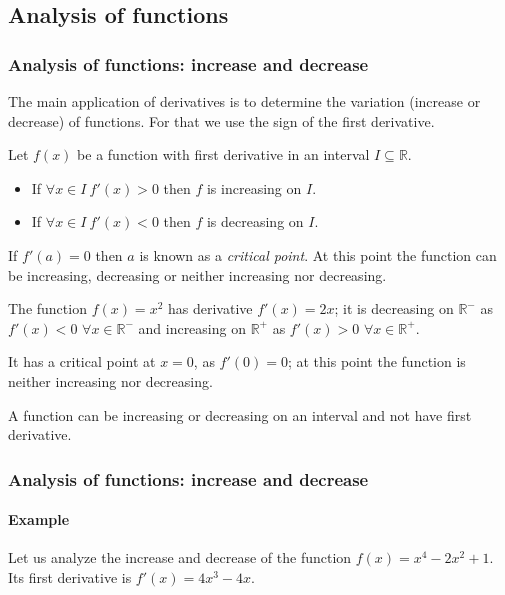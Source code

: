 \subsection{Analysis of functions}
\begin{frame}
\frametitle{Analysis of functions: increase and decrease}
The main application of derivatives is to determine the variation (increase or decrease) of functions. 
For that we use the sign of the first derivative.  
\begin{theorem}
Let $f(x)$ be a function with first derivative in an interval $I\subseteq \mathbb{R}$.
\begin{itemize}
\item If $\forall x\in I\ f'(x)> 0$ then $f$ is increasing on $I$.
\item If $\forall x\in I\ f'(x)< 0$ then $f$ is decreasing on $I$.
\end{itemize}
\end{theorem}
If $f'(a)=0$ then $a$ is known as a \emph{critical point}.
At this point the function can be increasing, decreasing or neither increasing nor decreasing. 

The function $f(x)=x^2$ has derivative $f'(x)=2x$; it is decreasing on $\mathbb{R}^-$ as $f'(x)< 0$ $\forall x\in \mathbb{R}^-$  and increasing on $\mathbb{R}^+$ as $f'(x)> 0$ $\forall x\in \mathbb{R}^+$.

It has a critical point at $x=0$, as $f'(0)=0$; at this point the function is neither increasing nor decreasing.

 {A function can be increasing or decreasing on an interval and not have first derivative.}
\end{frame}


\begin{frame}
\frametitle{Analysis of functions: increase and decrease}
\framesubtitle{Example}
Let us analyze the increase and decrease of the function $f(x)=x^4-2x^2+1$. 
Its first derivative is $f'(x)=4x^3-4x$.
\begin{center}
\scalebox{0.9}{}
\end{center}
\end{frame}



